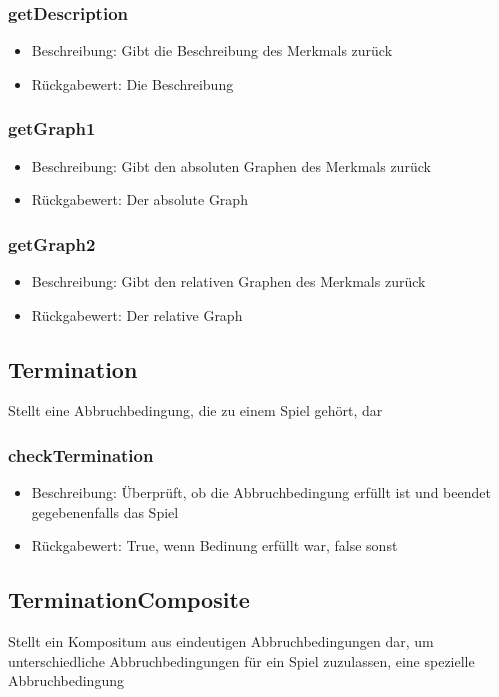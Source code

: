 \documentclass[a4paper]{scrreprt}
\begin{document}
	\subsubsection{getDescription}
	\begin{itemize}
		\item Beschreibung: Gibt die Beschreibung des Merkmals zurück
		\item Rückgabewert: Die Beschreibung
	\end{itemize}
	\subsubsection{getGraph1}
	\begin{itemize}
		\item Beschreibung: Gibt den absoluten Graphen des Merkmals zurück
		\item Rückgabewert: Der absolute Graph
	\end{itemize}
	\subsubsection{getGraph2}
	\begin{itemize}
		\item Beschreibung: Gibt den relativen Graphen des Merkmals zurück
		\item Rückgabewert: Der relative Graph
	\end{itemize}
	
	\subsection{Termination}
	Stellt eine Abbruchbedingung, die zu einem Spiel gehört, dar
	\subsubsection{checkTermination}
	\begin{itemize}
		\item Beschreibung: Überprüft, ob die Abbruchbedingung erfüllt ist und beendet gegebenenfalls das Spiel
		\item Rückgabewert: True, wenn Bedinung erfüllt war, false sonst
	\end{itemize}
	
	\subsection{TerminationComposite}
	Stellt ein Kompositum aus eindeutigen Abbruchbedingungen dar, um unterschiedliche Abbruchbedingungen für ein Spiel zuzulassen, eine spezielle Abbruchbedingung
\end{document}

